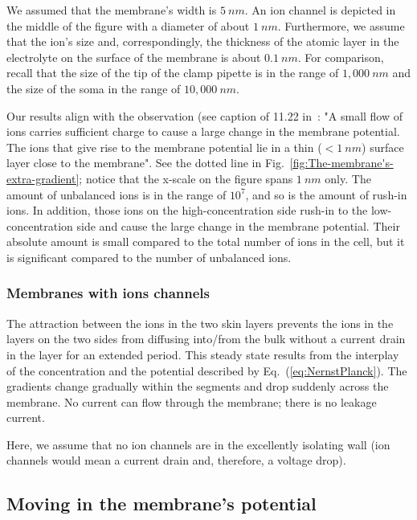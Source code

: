 We assumed that the membrane's width is $5\ nm$. An ion channel is
depicted in the middle of the figure with a diameter of about $1\ nm$.
Furthermore, we assume that the ion's size and, correspondingly, the
thickness of the atomic layer in the electrolyte on the surface of
the membrane is about $0.1\ nm$. For comparison, recall that the
size of the tip of the clamp pipette is in the range of $1,000\ nm$
and the size of the soma in the range of $10,000\ nm$. 

Our results align with the observation (see caption of 11.22 in~\cite{MolecularBiology:2002}:
"A small flow of ions carries sufficient charge to cause a large change in the membrane potential.
The ions that give rise to the membrane potential lie in a thin ($< 1\ nm$) surface layer close to the membrane".
See the dotted line in Fig.~\ref{fig:The-membrane's-extra-gradient}; notice that the x-scale on the figure spans $1\ nm$ only.
The amount of unbalanced ions is in the range of $10^7$,
and so is the amount of rush-in ions. In addition, those 
ions on the high-concentration side rush-in to the 
low-concentration side and cause the large change in the 
membrane potential. Their absolute amount is small compared to the total number of ions in the cell,
but it is significant compared to the number of unbalanced ions.


\subsubsection{Membranes with ions channels\label{sec:Physics-MembranesWithChannels}}

The attraction between the ions in the two skin layers
prevents the ions in the layers on the two sides from diffusing into/from
the bulk without a current drain in the layer for an extended period.
This steady state results from the interplay of the concentration
and the potential described by Eq.~(\ref{eq:NernstPlanck}). The gradients
change gradually within the segments and drop suddenly across the membrane.
No current can flow through the membrane; there is no leakage current.



Here, we
assume that no ion channels are in the excellently isolating wall
(ion channels would mean a current drain and, therefore, a voltage
drop). 

\subsection{Moving in the membrane's potential\label{sec:Physics-MovingPotential}}


